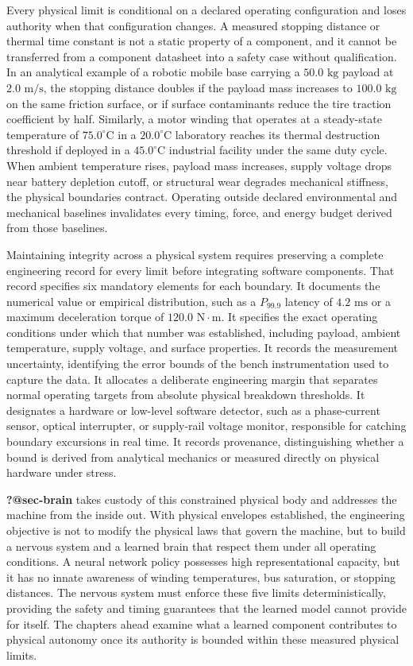 \documentclass[
  letterpaper,
  DIV=11,
  numbers=noendperiod]{scrartcl}
\begin{document}
Every physical limit is conditional on a declared operating
configuration and loses authority when that configuration changes. A
measured stopping distance or thermal time constant is not a static
property of a component, and it cannot be transferred from a component
datasheet into a safety case without qualification. In an analytical
example of a robotic mobile base carrying a \(50.0\text{ kg}\) payload
at \(2.0\text{ m/s}\), the stopping distance doubles if the payload mass
increases to \(100.0\text{ kg}\) on the same friction surface, or if
surface contaminants reduce the tire traction coefficient by half.
Similarly, a motor winding that operates at a steady-state temperature
of \(75.0^{\circ}\text{C}\) in a \(20.0^{\circ}\text{C}\) laboratory
reaches its thermal destruction threshold if deployed in a
\(45.0^{\circ}\text{C}\) industrial facility under the same duty cycle.
When ambient temperature rises, payload mass increases, supply voltage
drops near battery depletion cutoff, or structural wear degrades
mechanical stiffness, the physical boundaries contract. Operating
outside declared environmental and mechanical baselines invalidates
every timing, force, and energy budget derived from those baselines.

Maintaining integrity across a physical system requires preserving a
complete engineering record for every limit before integrating software
components. That record specifies six mandatory elements for each
boundary. It documents the numerical value or empirical distribution,
such as a \(P_{99.9}\) latency of \(4.2\text{ ms}\) or a maximum
deceleration torque of \(120.0\text{ N}\cdot\text{m}\). It specifies the
exact operating conditions under which that number was established,
including payload, ambient temperature, supply voltage, and surface
properties. It records the measurement uncertainty, identifying the
error bounds of the bench instrumentation used to capture the data. It
allocates a deliberate engineering margin that separates normal
operating targets from absolute physical breakdown thresholds. It
designates a hardware or low-level software detector, such as a
phase-current sensor, optical interrupter, or supply-rail voltage
monitor, responsible for catching boundary excursions in real time. It
records provenance, distinguishing whether a bound is derived from
analytical mechanics or measured directly on physical hardware under
stress.

\textbf{?@sec-brain} takes custody of this constrained physical body and
addresses the machine from the inside out. With physical envelopes
established, the engineering objective is not to modify the physical
laws that govern the machine, but to build a nervous system and a
learned brain that respect them under all operating conditions. A neural
network policy possesses high representational capacity, but it has no
innate awareness of winding temperatures, bus saturation, or stopping
distances. The nervous system must enforce these five limits
deterministically, providing the safety and timing guarantees that the
learned model cannot provide for itself. The chapters ahead examine what
a learned component contributes to physical autonomy once its authority
is bounded within these measured physical limits.
\end{document}
